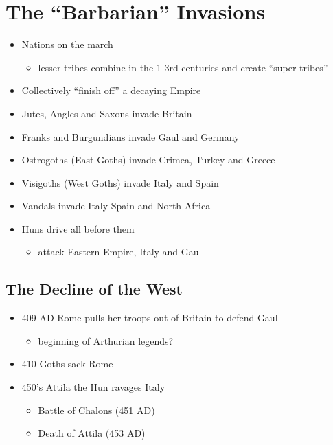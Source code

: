 \documentclass[12pt, twoside]{article}
\begin{document}
\section{The “Barbarian” Invasions}
\begin{itemize}
\item Nations on the march
	\begin{itemize}
	\item lesser tribes combine in the 1-3rd centuries and create “super tribes”
	\end{itemize}
\item Collectively “finish off” a decaying Empire
\item Jutes, Angles and Saxons invade Britain
\item Franks and Burgundians invade Gaul and Germany
\item Ostrogoths (East Goths) invade Crimea, Turkey and Greece
\item Visigoths (West Goths) invade Italy and Spain
\item Vandals invade Italy Spain and North Africa
\item Huns drive all before them
	\begin{itemize}
	\item attack Eastern Empire, Italy and Gaul
	\end{itemize}
\end{itemize}

\subsection{The Decline of the West}
\begin{itemize}
\item 409 AD Rome pulls her troops out of Britain to defend Gaul
	\begin{itemize}
	\item beginning of Arthurian legends?
	\end{itemize}
\item 410 Goths sack Rome
\item 450's Attila the Hun ravages Italy
	\begin{itemize}
	\item Battle of Chalons (451 AD)
	\item Death of Attila (453 AD)
	\end{itemize}
\end{itemize}
\end{document}
